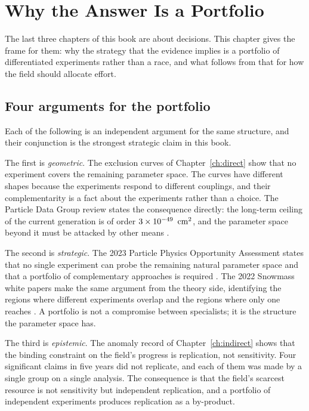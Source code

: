 
\chapter{Why the Answer Is a Portfolio}
\label{ch:portfolio}

The last three chapters of this book are about decisions. This chapter gives
the frame for them: why the strategy that the evidence implies is a
portfolio of differentiated experiments rather than a race, and what follows
from that for how the field should allocate effort.

\section{Four arguments for the portfolio}Each of the following is an
independent argument for the same structure, and their conjunction is the
strongest strategic claim in this book.

The first is \emph{geometric}. The exclusion curves of
Chapter~\ref{ch:direct} show that no experiment covers the remaining
parameter space. The curves have different shapes because the experiments
respond to different couplings, and their complementarity is a fact about
the experiments rather than a choice. The Particle Data Group review states
the consequence directly: the long-term ceiling of the current generation is
of order $3\times 10^{-49}\ \,\mathrm{cm}^{2}$, and the parameter space beyond it must
be attacked by other means .

The second is \emph{strategic}. The 2023 Particle Physics Opportunity
Assessment states that no single experiment can probe the remaining natural
parameter space and that a portfolio of complementary approaches is required
. The 2022 Snowmass white papers make the same argument from the
theory side, identifying the regions where different experiments overlap and
the regions where only one reaches . A
portfolio is not a compromise between specialists; it is the structure the
parameter space has.

The third is \emph{epistemic}. The anomaly record of Chapter~\ref{ch:indirect}
shows that the binding constraint on the field's progress is replication, not
sensitivity. Four significant claims in five years did not replicate, and
each of them was made by a single group on a single analysis. The
consequence is that the field's scarcest resource is not sensitivity but
independent replication, and a portfolio of independent experiments
produces replication as a by-product.

